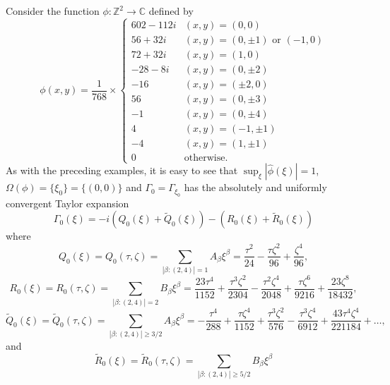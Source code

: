 \documentclass[11pt]{article}
\newenvironment{example}
  {\pushQED{\qed}\renewcommand{\qedsymbol}{$\triangle$}\examplex}
  {\popQED\endexamplex}
\theoremstyle{remark}
\newcommand{\f}[2]{\frac{#1}{#2}}
\begin{document}
\begin{example}\normalfont
Consider the function $\phi : \mathbb{Z}^2 \to \mathbb{C}$ defined by 
\begin{equation*}
    \phi(x,y) = 
    \f{1}{768}\times
    \begin{cases}
    602 - 112i &(x,y) = (0,0)\\
    56 + 32i   &(x,y) = (0,\pm 1)\mbox{ or }(-1,0)\\
    72 + 32i   &(x,y) = (1,0)\\
    -28 - 8i   &(x,y) = (0,\pm 2)\\
    -16        &(x,y) = (\pm 2,0)\\
    56         &(x,y) = (0,\pm 3)\\
    -1         &(x,y) = (0,\pm 4)\\
    4          &(x,y) = (-1,\pm 1)\\
    -4         &(x,y) = (1,\pm 1)\\
    0          &\text{otherwise}.
    \end{cases}
\end{equation*}
As with the preceding examples, it is easy to see that $\sup_{\xi}|\widehat{\phi}(\xi)|=1$, $\Omega(\phi)=\{\xi_0\}=\{(0,0)\}$ and $\Gamma_{0}=\Gamma_{\xi_0}$ has the absolutely and uniformly convergent Taylor expansion
\begin{equation*}
    \Gamma_{0}(\xi)=-i\left(Q_0(\xi)+\widetilde{Q}_0(\xi)\right)-\left(R_0(\xi)+\widetilde{R}_0(\xi)\right)
\end{equation*}
where
\begin{equation*}
    Q_0(\xi)=Q_0(\tau,\zeta)=\sum_{|\beta:(2,4)|=1}A_\beta \xi^\beta=\frac{\tau^2}{24}-\frac{\tau\zeta^2}{96} +\frac{ \zeta^4}{96},
\end{equation*}
\begin{equation*}
    R_0(\xi)=R_0(\tau,\zeta)=\sum_{|\beta:(2,4)|=2}B_\beta \xi^\beta=\frac{23\tau^4}{1152}  + \frac{\tau^3\zeta^2}{2304}  - \frac{\tau^2\zeta^4}{2048} + \f{\tau\zeta^6}{9216}+ \frac{23\zeta^8}{18432},
\end{equation*}
\begin{equation*}
    \widetilde{Q}_0(\xi)=\widetilde{Q}_0(\tau,\zeta)=\sum_{|\beta:(2,4)|\geq 3/2}A_\beta \xi^\beta=- \frac{\tau^4}{288}+\frac{\tau\zeta^4}{1152} +\frac{\tau^3\zeta^2}{576}  -\frac{\tau^3\zeta^4}{6912} + \frac{43 \tau^4\zeta^4}{221184} + \dots,
\end{equation*}
and
\begin{equation*}
    \widetilde{R}_0(\xi)=\widetilde{R}_0(\tau,\zeta)=\sum_{|\beta:(2,4)|\geq 5/2}B_\beta \xi^\beta

\end{equation*}
\end{example}
\end{document}
